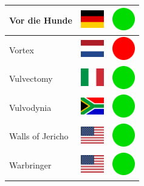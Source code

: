 \documentclass[12pt, a4paper, twoside]{report}
\begin{document}
\begin{center}
\begin{longtable}{|p{5cm}|p{2cm}|p{2cm}|}
 Vor die Hunde                                              & \includegraphics[width=1cm]{../4x3/de} &   \includegraphics[width=1cm]{../likes/y} \\ \hline
 Vortex                                                     & \includegraphics[width=1cm]{../4x3/nl} &   \includegraphics[width=1cm]{../likes/n} \\ \hline
 Vulvectomy                                                 & \includegraphics[width=1cm]{../4x3/it} &   \includegraphics[width=1cm]{../likes/y} \\ \hline
 Vulvodynia                                                 & \includegraphics[width=1cm]{../4x3/za} &   \includegraphics[width=1cm]{../likes/y} \\ \hline
 Walls of Jericho                                           & \includegraphics[width=1cm]{../4x3/us} &   \includegraphics[width=1cm]{../likes/y} \\ \hline
 Warbringer                                                 & \includegraphics[width=1cm]{../4x3/us} &   \includegraphics[width=1cm]{../likes/y} \\ \hline

\end{longtable}
\end{center}
\end{document}
